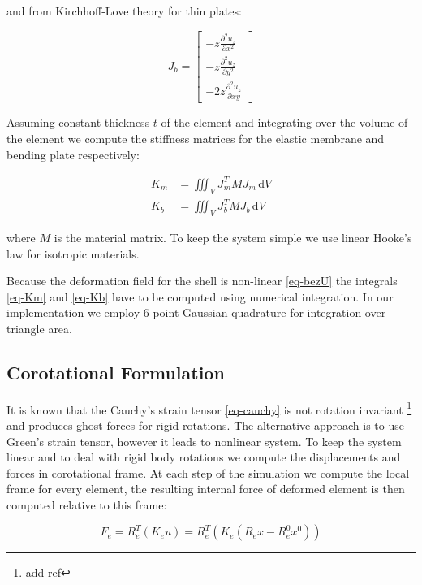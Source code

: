 \documentclass{egpubl}
\newcommand{\deriv}[2]{\frac{\partial #1}{\partial #2}}
\begin{document}
\noindent
and from Kirchhoff-Love theory for thin plates:

\begin{equation}\label{eq-kirchhoff}
    J_b = \left[ \begin{matrix}
        - z \deriv{^2 u_z}{x^2} \\
        - z \deriv{^2 u_z}{y^2} \\
        - 2z \deriv{^2 u_z}{xy}
    \end{matrix} \right]
\end{equation}

Assuming constant thickness $t$ of the element and integrating over the volume
of the element we compute the stiffness matrices for the elastic membrane
and bending plate respectively:

\begin{align}
    \label{eq-Km}
    K_m & = \iiint_V J_m^T M J_m \, \mathrm{d} V \\
    \label{eq-Kb}
    K_b & = \iiint_V J_b^T M J_b \, \mathrm{d} V
\end{align}

\noindent
where $M$ is the material matrix. To keep the system simple we use linear
Hooke's law for isotropic materials.

Because the deformation field for the shell is non-linear \eqref{eq-bezU}
the integrals \eqref{eq-Km} and \eqref{eq-Kb} have to be computed using
numerical integration. In our implementation we employ 6-point Gaussian
quadrature for integration over triangle area.


\subsection{Corotational Formulation} %
\label{sec-corot}

It is known that the Cauchy's strain tensor \eqref{eq-cauchy} is not
rotation invariant \footnote{add ref} and produces ghost forces for rigid
rotations. The alternative approach is to use Green's strain tensor,
however it leads to nonlinear system. To keep the system linear and to deal
with rigid body rotations we compute the displacements and forces in
corotational frame. At each step of the simulation we compute the local
frame for every element, the resulting internal force of deformed element
is then computed relative to this frame:

\begin{equation}
    F_e = R_e^T (K_e u) = R_e^T \left(K_e(R_e x - R_e^0 x^0)\right)
\end{equation}
\end{document}
